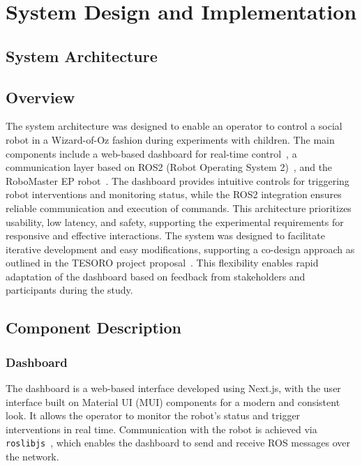 \documentclass[a4paper]{usiinfbachelorproject}
\begin{document}
\section{\textbf{System Design and Implementation}}\label{sec:system}

\subsection{\textbf{System Architecture}}
\subsection*{\textbf{Overview}}
The system architecture was designed to enable an operator to control a social robot in a Wizard-of-Oz fashion during experiments with children.
The main components include a web-based dashboard for real-time control~\cite{frovaaa2025hogwarts}, a communication layer based on ROS2 (Robot Operating System 2)~\cite{ros2, frovaaa2025robomaster, frovaaa2025robomasterhri}, and the RoboMaster EP robot~\cite{djirobomasterep}.
The dashboard provides intuitive controls for triggering robot interventions and monitoring status, while the ROS2 integration ensures reliable communication and execution of commands.
This architecture prioritizes usability, low latency, and safety, supporting the experimental requirements for responsive and effective interactions.
The system was designed to facilitate iterative development and easy modifications, supporting a co-design approach as outlined in the TESORO project proposal~\cite{landoni2025tesoro}.
This flexibility enables rapid adaptation of the dashboard based on feedback from stakeholders and participants during the study.

\subsection{\textbf{Component Description}}
\subsubsection*{\textbf{Dashboard}}
The dashboard is a web-based interface developed using Next.js, with the user interface built on Material UI (MUI) components for a modern and consistent look.
It allows the operator to monitor the robot's status and trigger interventions in real time. Communication with the robot is achieved via \texttt{roslibjs}~\cite{roslibjs}, which enables the dashboard to send and receive ROS messages over the network.
\end{document}
